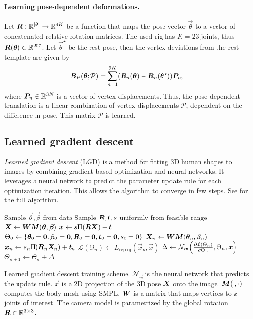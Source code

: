 \paragraph{Learning pose-dependent deformations.}

Let $\bm{R}: \mathbb{R}^{|\bm{\theta}|} \to \mathbb{R}^{9K}$ be a function that maps the pose vector
$\vec{\theta}$ to a vector of concatenated relative rotation matrices. The used rig has $K=23$ joints, thus
$\bm{R}(\bm{\theta}) \in \mathbb{R}^{207}$. Let $\vec{\theta}^\star$ be the rest pose, then the vertex
deviations from the rest template are given by \[
    \bm{B}_P(\bm{\theta}; \mathcal{P}) = \sum_{n=1}^{9K} (\bm{R}_n(\bm{\theta}) - \bm{R}_n(\bm{\theta}^\star)) \bm{P}_n,
\]
where $\bm{P}_n \in \mathbb{R}^{3N}$ is a vector of vertex displacements. Thus, the pose-dependent translation is a linear combination of
vertex displacements $\mathcal{P}$, dependent on the difference in pose. This matrix $\mathcal{P}$
is learned.

\subsection{Learned gradient descent}

\textit{Learned gradient descent} (LGD) \citep{song2020human} is a method for fitting 3D human shapes
to images by combining gradient-based optimization and neural networks. It leverages a neural network
to predict the parameter update rule for each optimization iteration. This allows the algorithm to
converge in few steps. See  for the full algorithm.

\begin{algorithm}
    \begin{algorithmic}[1]
        \State Sample $\vec{\theta}, \vec{\beta}$ from data
        \State Sample $\bm{R}, \bm{t}, s$ uniformly from feasible range
        \State $\bm{X} \gets \bm{W} \bm{M}(\bm{\theta}, \bm{\beta})$
        \State $\bm{x} \gets s \Pi(\bm{R} \bm{X}) + \bm{t}$
        \State $\Theta_0 \gets \{ \bm{\theta}_0 = \bm{0}, \bm{\beta}_0 = \bm{0}, \bm{R}_0 = \bm{0}, \bm{t}_0 = \bm{0}, s_0 = 0 \}$
        \State $\bm{X}_n \gets \bm{W} \bm{M}(\bm{\theta}_n, \bm{\beta}_n)$
        \State $\bm{x}_n \gets s_n \Pi(\bm{R}_n \bm{X}_n) + \bm{t}_n$
        \State $\mathcal{L}(\Theta_n) \gets L_{\mathrm{reproj}}(\vec{x}_n, \vec{x})$
        \State $\Delta \gets \mathcal{N}_{\vec{w}} \lft( \pdv{\mathcal{L}(\Theta_n)}{\Theta_n}, \Theta_n, \vec{x} \rgt)$
        \State $\Theta_{n+1} \gets \Theta_n + \Delta$
        \EndFor
    \end{algorithmic}
    \caption{Learned gradient descent training scheme. $\mathcal{N}_{\vec{w}}$ is the neural network that predicts the update rule. $\vec{x}$ is a 2D projection of the 3D pose $\bm{X}$ onto the image. $\bm{M}(\cdot, \cdot)$ computes the body mesh using SMPL. $\bm{W}$ is a matrix that maps vertices to $k$ joints of interest. The camera model is parametrized by the global rotation $\bm{R} \in \mathbb{R}^{3\times 3}$.}
    \label{alg:lgd}
\end{algorithm}
